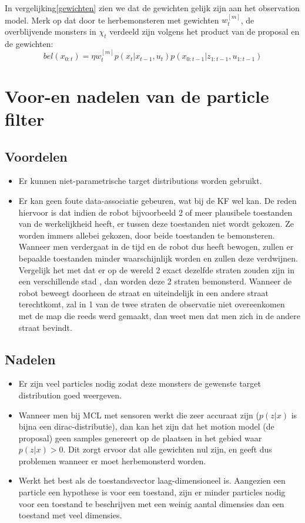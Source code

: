 \documentclass{book}
\begin{document}
In vergelijking\ref{gewichten} zien we dat de gewichten gelijk zijn aan het observation model.
Merk op dat door te herbemonsteren met gewichten $w_{t}^{[m]}$, de overblijvende monsters in $\chi_{t}$ verdeeld zijn volgens het product van de proposal en de gewichten:
\begin{equation}
bel(x_{0:t})= \eta w_{t}^{[m]} p(x_{t}|x_{t-1},u_{t}) p(x_{0:t-1}|z_{1:t-1},u_{1:t-1})
\end{equation}


\section{Voor-en nadelen van de particle filter}
\subsection{Voordelen}
\begin{itemize}
\item Er kunnen niet-parametrische target distributions worden gebruikt.
\item Er kan geen foute data-associatie gebeuren, wat bij de KF wel kan. De reden hiervoor is dat indien de robot bijvoorbeeld 2 of meer plausibele toestanden van de werkelijkheid heeft, er tussen deze toestanden niet wordt gekozen. Ze worden immers allebei gekozen, door beide toestanden te bemonsteren. Wanneer men verdergaat in de tijd en de robot dus heeft bewogen, zullen er bepaalde toestanden minder waarschijnlijk worden en zullen deze verdwijnen. Vergelijk het met dat er op de wereld 2 exact dezelfde straten zouden zijn in een verschillende stad , dan worden deze 2 straten bemonsterd. Wanneer de robot beweegt doorheen de straat en uiteindelijk in een andere straat terechtkomt, zal in 1 van de twee straten de observatie niet overeenkomen met de map die reeds werd gemaakt, dan weet men dat men zich in de andere straat bevindt.  
\end{itemize}

\subsection{Nadelen}
\begin{itemize}
\item Er zijn veel particles nodig zodat deze monsters de gewenste target distribution goed weergeven.
\item Wanneer men bij MCL met sensoren werkt die zeer accuraat zijn ($p(z|x)$ is bijna een dirac-distributie), dan kan het zijn dat het motion model (de proposal) geen samples genereert op de plaatsen in het gebied waar $p(z|x) > 0$. Dit zorgt ervoor dat alle gewichten nul zijn, en geeft dus problemen wanneer er moet herbemonsterd worden.
\item Werkt het best als de toestandsvector laag-dimensioneel is. Aangezien een particle een hypothese is voor een toestand, zijn er minder particles nodig voor een toestand te beschrijven met een weinig aantal dimensies dan een toestand met veel dimensies. 
\label{nadelen}
\end{itemize}
\end{document}
